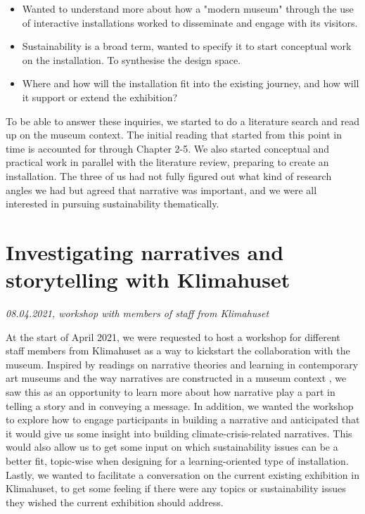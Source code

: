 \begin{itemize}
    \item Wanted to understand more about how a "modern museum" through the use of interactive installations worked to disseminate and engage with its visitors.
    \item Sustainability is a broad term, wanted to specify it to start conceptual work on the installation. To synthesise the design space.
    \item Where and how will the installation fit into the existing journey, and how will it support or extend the exhibition?
\end{itemize}

To be able to answer these inquiries, we started to do a literature search and read up on the museum context. The initial reading that started from this point in time is accounted for through Chapter 2-5. We also started conceptual and practical work in parallel with the literature review, preparing to create an installation. The three of us had not fully figured out what kind of research angles we had but agreed that narrative was important, and we were all interested in pursuing sustainability thematically.

\break
\section{Investigating narratives and storytelling with Klimahuset}
\par
\emph{08.04.2021, workshop with members of staff from Klimahuset}
\par

At the start of April 2021, we were requested to host a workshop for different staff members from Klimahuset as a way to kickstart the collaboration with the museum. Inspired by readings on narrative theories and learning in contemporary art museums and the way narratives are constructed in a museum context \autocite{narrative_sitzia}, we saw this as an opportunity to learn more about how narrative play a part in telling a story and in conveying a message. In addition, we wanted the workshop to explore how to engage participants in building a narrative and anticipated that it would give us some insight into building climate-crisis-related narratives. This would also allow us to get some input on which sustainability issues can be a better fit, topic-wise when designing for a learning-oriented type of installation. Lastly, we wanted to facilitate a conversation on the current existing exhibition in Klimahuset, to get some feeling if there were any topics or sustainability issues they wished the current exhibition should address. 

